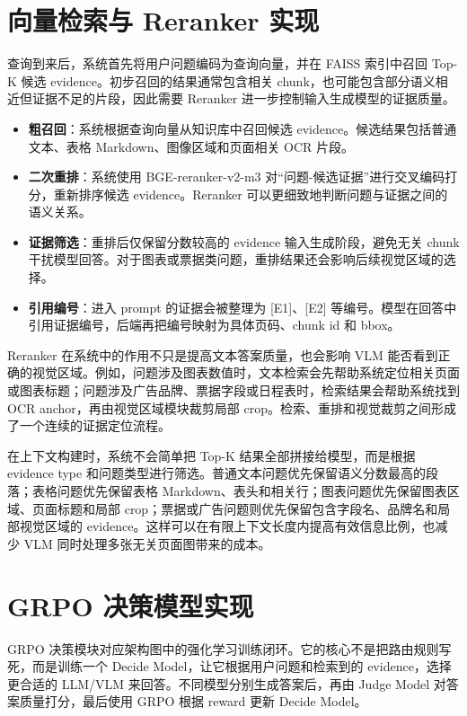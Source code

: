 \section{向量检索与 Reranker 实现}

查询到来后，系统首先将用户问题编码为查询向量，并在 FAISS 索引中召回 Top-K 候选 evidence。初步召回的结果通常包含相关 chunk，也可能包含部分语义相近但证据不足的片段，因此需要 Reranker 进一步控制输入生成模型的证据质量。

\begin{itemize}
  \item \textbf{粗召回}：系统根据查询向量从知识库中召回候选 evidence。候选结果包括普通文本、表格 Markdown、图像区域和页面相关 OCR 片段。
  \item \textbf{二次重排}：系统使用 BGE-reranker-v2-m3 对“问题-候选证据”进行交叉编码打分，重新排序候选 evidence。Reranker 可以更细致地判断问题与证据之间的语义关系。
  \item \textbf{证据筛选}：重排后仅保留分数较高的 evidence 输入生成阶段，避免无关 chunk 干扰模型回答。对于图表或票据类问题，重排结果还会影响后续视觉区域的选择。
  \item \textbf{引用编号}：进入 prompt 的证据会被整理为 [E1]、[E2] 等编号。模型在回答中引用证据编号，后端再把编号映射为具体页码、chunk id 和 bbox。
\end{itemize}

Reranker 在系统中的作用不只是提高文本答案质量，也会影响 VLM 能否看到正确的视觉区域。例如，问题涉及图表数值时，文本检索会先帮助系统定位相关页面或图表标题；问题涉及广告品牌、票据字段或日程表时，检索结果会帮助系统找到 OCR anchor，再由视觉区域模块裁剪局部 crop。检索、重排和视觉裁剪之间形成了一个连续的证据定位流程。

在上下文构建时，系统不会简单把 Top-K 结果全部拼接给模型，而是根据 evidence type 和问题类型进行筛选。普通文本问题优先保留语义分数最高的段落；表格问题优先保留表格 Markdown、表头和相关行；图表问题优先保留图表区域、页面标题和局部 crop；票据或广告问题则优先保留包含字段名、品牌名和局部视觉区域的 evidence。这样可以在有限上下文长度内提高有效信息比例，也减少 VLM 同时处理多张无关页面图带来的成本。

\section{GRPO 决策模型实现}

GRPO 决策模块对应架构图中的强化学习训练闭环。它的核心不是把路由规则写死，而是训练一个 Decide Model，让它根据用户问题和检索到的 evidence，选择更合适的 LLM/VLM 来回答。不同模型分别生成答案后，再由 Judge Model 对答案质量打分，最后使用 GRPO 根据 reward 更新 Decide Model。

